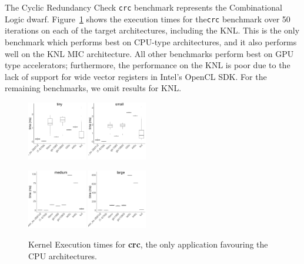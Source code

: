\documentclass[../document.tex]{subfiles}
\begin{document}
\label{ssec:time}
	
The Cyclic Redundancy Check {\tt crc} benchmark represents the Combinational Logic dwarf.
Figure~\ref{fig:time-crc} shows the execution times for the{\tt crc} benchmark over 50 iterations on each of the target architectures, including the KNL.
This is the only benchmark which performs best on CPU-type architectures, and it also performs well on the KNL MIC architecture.
All other benchmarks perform best on GPU type accelerators; furthermore, the performance on the KNL is poor due to the lack of support for wide vector registers in Intel's OpenCL SDK.
For the remaining benchmarks, we omit results for KNL.

\begin{figure}[h]
	\centering
	\includegraphics[width=0.23\textwidth]{figures/time-results/generate_crc_tiny_boxplot_knl-1}
	\includegraphics[width=0.23\textwidth]{figures/time-results/generate_crc_small_boxplot_knl-1}
	
	\includegraphics[width=0.23\textwidth]{figures/time-results/generate_crc_medium_boxplot_knl-1}
	\includegraphics[width=0.23\textwidth]{figures/time-results/generate_crc_large_boxplot_knl-1}
	\caption{Kernel Execution times for {\bf crc}, the only application favouring the CPU architectures.}
	\label{fig:time-crc}
\end{figure}
\end{document}
